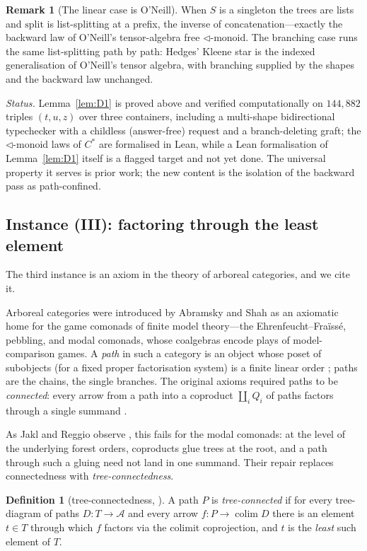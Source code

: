 \documentclass[11pt,reqno]{amsart}
\theoremstyle{plain}
\theoremstyle{definition}
\newtheorem{definition}[theorem]{Definition}
\newtheorem{remark}[theorem]{Remark}
\newcommand{\spl}{\mathrm{split}}
\newcommand{\A}{\mathcal{A}}
\begin{document}
\begin{remark}[The linear case is O'Neill]
When $S$ is a singleton the trees are lists and $\spl$ is list-splitting at a prefix, the inverse of
concatenation---exactly the backward law of O'Neill's tensor-algebra free $\triangleleft$-monoid. The
branching case runs the same list-splitting path by path: Hedges' Kleene star is the indexed
generalisation of O'Neill's tensor algebra, with branching supplied by the shapes and the backward law
unchanged.
\end{remark}

\emph{Status.} Lemma~\ref{lem:D1} is proved above and verified computationally on $144{,}882$ triples
$(t,u,z)$ over three containers, including a multi-shape bidirectional typechecker with a childless
(answer-free) request and a branch-deleting graft; the $\triangleleft$-monoid laws of $C^{*}$ are
formalised in Lean, while a Lean formalisation of Lemma~\ref{lem:D1} itself is a flagged target and not
yet done. The universal property it serves is prior work; the new content is the isolation of the
backward pass as path-confined.

\subsection{Instance (III): factoring through the least element}\label{sec:arboreal}
The third instance is an axiom in the theory of arboreal categories, and we cite it.

Arboreal categories were introduced by Abramsky and Shah \cite{AbramskyShah2021} as an axiomatic home for
the game comonads of finite model theory---the Ehrenfeucht--Fra\"iss\'e, pebbling, and modal comonads,
whose coalgebras encode plays of model-comparison games. A \emph{path} in such a category is an object
whose poset of subobjects (for a fixed proper factorisation system) is a finite linear order
\cite[Def.~4]{JaklReggio2026}; paths are the chains, the single branches. The original axioms required
paths to be \emph{connected}: every arrow from a path into a coproduct $\coprod_{i} Q_i$ of paths
factors through a single summand \cite[Def.~5]{JaklReggio2026}.

As Jakl and Reggio observe \cite[Ex.~8]{JaklReggio2026}, this fails for the modal comonads: at the level
of the underlying forest orders, coproducts glue trees at the root, and a path through such a gluing need
not land in one summand. Their repair replaces connectedness with \emph{tree-connectedness}.

\begin{definition}[tree-connectedness, {\cite[Def.~11]{JaklReggio2026}}]\label{def:tc}
A path $P$ is \emph{tree-connected} if for every tree-diagram of paths $D : T \to \A$ and every arrow
$f : P \to \operatorname{colim} D$ there is an element $t \in T$ through which $f$ factors via the colimit
coprojection, and $t$ is the \emph{least} such element of $T$.
\end{definition}
\end{document}
